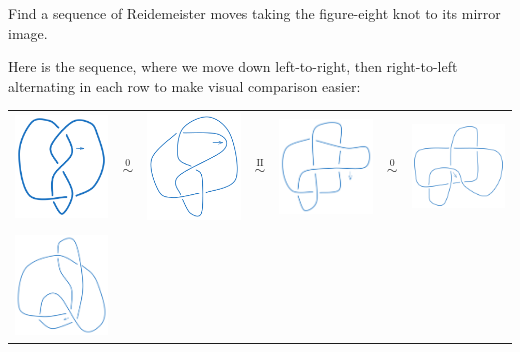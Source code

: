 \documentclass[10pt]{article}
\begin{document}
\begin{example}\label{b2e125}
	Find a sequence of Reidemeister moves taking the figure-eight knot to its mirror image.
\end{example}
\sol Here is the sequence, where we move down left-to-right, then right-to-left alternating in each row to make visual comparison easier:
\begin{center}
	\begin{tabular}{ m{9em} c m{9em} c m{9em} c m{9em} } 
		\includegraphics[width=9em]{figs/b2e125_1.png}&
		$\overset{\text{0}}{\sim}$&
		\includegraphics[width=9em]{figs/b2e125_2.png}&
		$\overset{\text{II}}{\sim}$&
		\includegraphics[width=9em]{figs/b2e125_3.png}&
		$\overset{\text{0}}{\sim}$&
		\includegraphics[width=9em]{figs/b2e125_4.png}\\
		&&&&&&\rotatebox[origin=c]{90}{$\sim$}\text{\scriptsize{III}}\\
		\includegraphics[width=9em]{figs/b2e125_8.png}&

\end{tabular}
\end{center}
\end{document}
